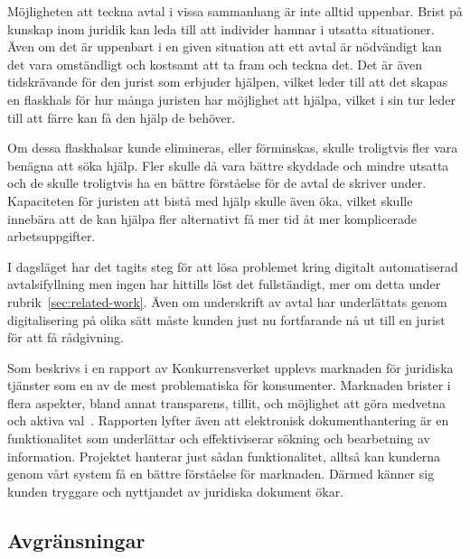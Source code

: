 \documentclass[a4paper,12pt]{article}
\begin{document}
Möjligheten att teckna avtal i vissa sammanhang är inte alltid uppenbar. Brist på kunskap inom juridik kan leda till att individer hamnar i utsatta situationer. Även om det är uppenbart i en given situation att ett avtal är nödvändigt kan det vara omständligt och kostsamt att ta fram och teckna det. Det är även tidskrävande för den jurist som erbjuder hjälpen, vilket leder till att det skapas en flaskhals för hur många juristen har möjlighet att hjälpa, vilket i sin tur leder till att färre kan få den hjälp de behöver.


Om dessa flaskhalsar kunde elimineras, eller förminskas, skulle troligtvis fler vara ben\-ägna att söka hjälp. Fler skulle då vara bättre skyddade och mindre utsatta och de skulle troligtvis ha en bättre förståelse för de avtal de skriver under. Kapaciteten för juristen att bistå med hjälp skulle även öka, vilket skulle innebära att de kan hjälpa fler alternativt få mer tid åt mer komplicerade arbetsuppgifter.


I dagsläget har det tagits steg för att lösa problemet kring digitalt automatiserad avtalsifyllning men ingen har hittills löst det fullständigt, mer om detta under rubrik~\ref{sec:related-work}. Även om underskrift av avtal har underlättats genom digitalisering på olika sätt måste kunden just nu fortfarande nå ut till en jurist för att få rådgivning. 

Som beskrivs i en rapport av Konkurrensverket upplevs marknaden för juridiska tjänster som en av de mest problematiska för konsumenter. Marknaden brister i flera aspekter, bland annat transparens, tillit, och möjlighet att göra medvetna och aktiva val~\cite{web:konkurrensverket}. Rapporten lyfter även att elektronisk dokumenthantering är en funktionalitet som underlättar och effektiviserar sökning och bearbetning av information. Projektet hanterar just sådan funktionalitet, alltså kan kunderna genom vårt system få en bättre förståelse för marknaden. Därmed känner sig kunden tryggare och nyttjandet av juridiska dokument ökar.

\subsection{Avgränsningar}

\end{document}
